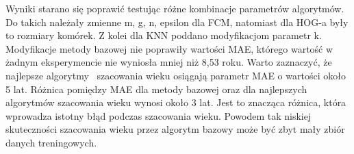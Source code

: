 \documentclass[a4paper,twoside,12pt]{book}
\newcounter{stronyPozaNumeracja}
\begin{document}
    Wyniki starano się poprawić testując różne kombinacje parametrów algorytmów.
    Do takich należały zmienne m, g, n, epsilon dla FCM, natomiast dla HOG-a były to rozmiary komórek.
    Z kolei dla KNN poddano modyfikacjom parametr k. Modyfikacje metody bazowej nie poprawiły wartości MAE,
    którego wartość w żadnym eksperymencie nie wyniosła mniej niż 8,53 roku. Warto zaznaczyć, że najlepsze
    algorytmy~\cite{khryashchevGanin}
    szacowania wieku osiągają parametr MAE o wartości około 5 lat.
    Różnica pomiędzy MAE dla metody bazowej oraz dla
    najlepszych algorytmów szacowania wieku wynosi około 3 lat. Jest to znacząca różnica, która wprowadza
    istotny błąd podczas szacowania wieku. Powodem tak niskiej skuteczności szacowania wieku przez algorytm
    bazowy może być zbyt mały zbiór danych treningowych.


    \backmatter
    \setcounter{page}{\value{stronyPozaNumeracja}}

    \pagestyle{tylkoNumeryStron}

    
    

\end{document}
